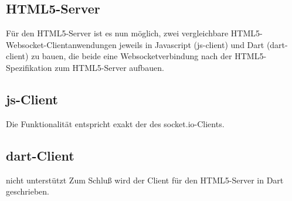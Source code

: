 \subsection{HTML5-Server}

Für den HTML5-Server ist es nun möglich, zwei vergleichbare HTML5-Websocket-Clientanwendungen jeweils in Javascript (js-client) und Dart (dart-client) zu bauen, die beide eine Websocketverbindung nach der HTML5-Spezifikation zum HTML5-Server aufbauen.

\subsection{js-Client}
Die Funktionalität entspricht exakt der des socket.io-Clients. 

\subsection{dart-Client}nicht unterstützt
Zum Schluß wird der Client für den HTML5-Server in Dart geschrieben. 

\renewcommand{\arraystretch}{1.2}

